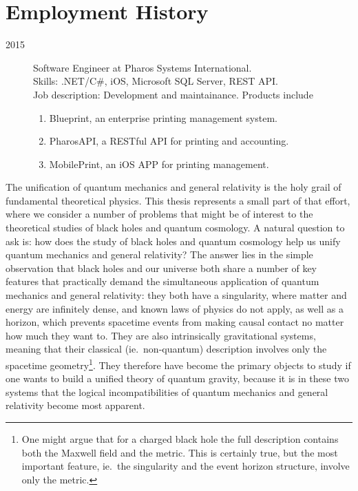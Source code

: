 \documentclass{brownthesis}
\begin{document}
\section*{Employment History}
\begin{description}
\item[2015] Software Engineer at Pharos Systems International.\\
  {Skills:} .NET/C\#, iOS, Microsoft SQL Server, REST API.\\
  {Job description:} Development and maintainance. Products include
  \begin{enumerate}
  \item Blueprint, an enterprise printing management system.
  \item PharosAPI, a RESTful API for printing and accounting.
  \item MobilePrint, an iOS APP for printing management.
  \end{enumerate}
\end{description}

The unification of quantum mechanics and general relativity is the holy grail of fundamental theoretical physics. This thesis represents a small part of that effort, where we consider a number of problems that might be of interest to the theoretical studies of black holes and quantum cosmology. A natural question to ask is: how does the study of black holes and quantum cosmology help us unify quantum mechanics and general relativity? The answer lies in the simple observation that black holes and our universe both share a number of key features that practically demand the simultaneous application of quantum mechanics and general relativity: they both have a singularity, where matter and energy are infinitely dense, and known laws of physics do not apply, as well as a horizon, which prevents spacetime events from making causal contact no matter how much they want to. They are also intrinsically gravitational systems, meaning that their classical (ie.~non-quantum) description involves only the spacetime geometry\footnote{One might argue that for a charged black hole the full description contains both the Maxwell field and the metric. This is certainly true, but the most important feature, ie.~the singularity and the event horizon structure, involve only the metric.}. They therefore have become the primary objects to study if one wants to build a unified theory of quantum gravity, because it is in these two systems that the logical incompatibilities of quantum mechanics and general relativity become most apparent.
\end{document}
